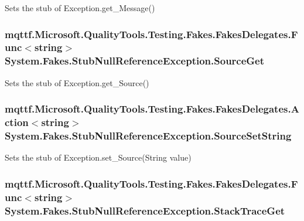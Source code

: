 Sets the stub of Exception.\-get\-\_\-\-Message()

\hypertarget{class_system_1_1_fakes_1_1_stub_null_reference_exception_a1854e128353680998ed26a11243d19ac}{
\subsubsection[{Source\-Get}]{\setlength{\rightskip}{0pt plus 5cm}mqttf.\-Microsoft.\-Quality\-Tools.\-Testing.\-Fakes.\-Fakes\-Delegates.\-Func$<$string$>$ System.\-Fakes.\-Stub\-Null\-Reference\-Exception.\-Source\-Get}}\label{class_system_1_1_fakes_1_1_stub_null_reference_exception_a1854e128353680998ed26a11243d19ac}


Sets the stub of Exception.\-get\-\_\-\-Source()

\hypertarget{class_system_1_1_fakes_1_1_stub_null_reference_exception_a33e8c6b1d03f32a7b33cb7ff021199d9}{
\subsubsection[{Source\-Set\-String}]{\setlength{\rightskip}{0pt plus 5cm}mqttf.\-Microsoft.\-Quality\-Tools.\-Testing.\-Fakes.\-Fakes\-Delegates.\-Action$<$string$>$ System.\-Fakes.\-Stub\-Null\-Reference\-Exception.\-Source\-Set\-String}}\label{class_system_1_1_fakes_1_1_stub_null_reference_exception_a33e8c6b1d03f32a7b33cb7ff021199d9}


Sets the stub of Exception.\-set\-\_\-\-Source(\-String value)

\hypertarget{class_system_1_1_fakes_1_1_stub_null_reference_exception_add03f6b0ac9fff5c4aef90bb473e032f}{
\subsubsection[{Stack\-Trace\-Get}]{\setlength{\rightskip}{0pt plus 5cm}mqttf.\-Microsoft.\-Quality\-Tools.\-Testing.\-Fakes.\-Fakes\-Delegates.\-Func$<$string$>$ System.\-Fakes.\-Stub\-Null\-Reference\-Exception.\-Stack\-Trace\-Get}}\label{class_system_1_1_fakes_1_1_stub_null_reference_exception_add03f6b0ac9fff5c4aef90bb473e032f}



